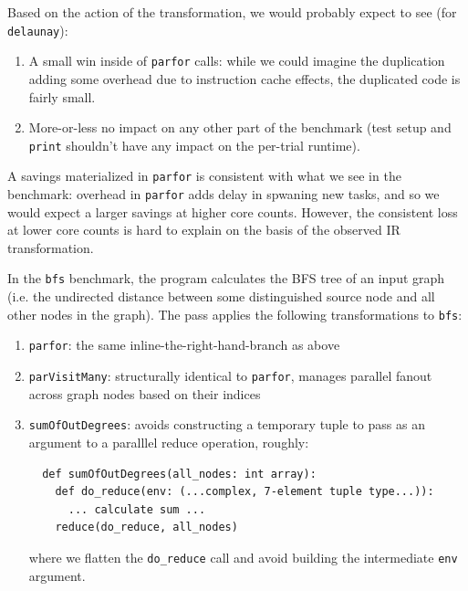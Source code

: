 \documentclass[leqno,11pt]{article}
\begin{document}
Based on the action of the transformation, we would probably expect to see (for
\texttt{delaunay}):
\begin{enumerate}
\item A small win inside of \texttt{parfor} calls: while we could imagine the
  duplication adding some overhead due to instruction cache effects, the
  duplicated code is fairly small.

\item More-or-less no impact on any other part of the benchmark (test setup and
  \texttt{print} shouldn't have any impact on the per-trial runtime).
\end{enumerate}


A savings materialized in \texttt{parfor} is consistent with what we see in the
benchmark: overhead in \texttt{parfor} adds delay in spwaning new tasks, and so
we would expect a larger savings at higher core counts. However, the consistent
loss at lower core counts is hard to explain on the basis of the observed IR
transformation.

In the \texttt{bfs} benchmark, the program calculates the BFS tree of an input
graph (i.e. the undirected distance between some distinguished source node and
all other nodes in the graph). The pass applies the following transformations to
\texttt{bfs}:
\begin{enumerate}
\item \texttt{parfor}: the same inline-the-right-hand-branch as above

\item \texttt{parVisitMany}: structurally identical to \texttt{parfor}, manages
  parallel fanout across graph nodes based on their indices

\item \texttt{sumOfOutDegrees}: avoids constructing a temporary tuple to pass as
  an argument to a paralllel reduce operation, roughly:

\begin{verbatim}
  def sumOfOutDegrees(all_nodes: int array):
    def do_reduce(env: (...complex, 7-element tuple type...)):
      ... calculate sum ...
    reduce(do_reduce, all_nodes)
\end{verbatim}

where we flatten the \texttt{do\_reduce} call and avoid building the intermediate
\texttt{env} argument.

\end{enumerate}
\end{document}
